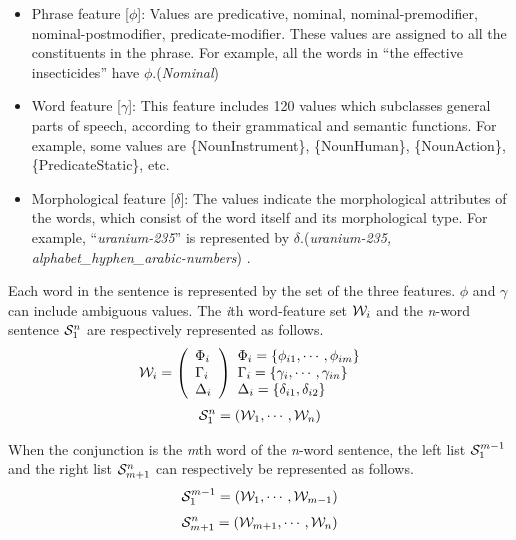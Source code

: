   \begin{itemize}
    \item Phrase feature [$\phi$]:
Values are predicative, nominal, nominal-premodifier,
nominal-postmodifier, predicate-modifier. These values are assigned to
all the constituents in the phrase.  For example, all the words in
``the effective insecticides'' have $\phi$.({\sl Nominal})

    \item Word feature [$\gamma$]:
This feature includes 120 values which subclasses
general parts of speech, according to their grammatical and
semantic functions. For example, some values are \{NounInstrument\},
\{NounHuman\}, \{NounAction\}, \{PredicateStatic\}, etc.

    \item Morphological feature [$\delta$]:
The values indicate the morphological attributes of the
words, which consist of the word itself and its morphological type.
For example, ``{\sl uranium-235}'' is represented by
$\delta$.({\sl uranium-235, alphabet\_hyphen\_arabic-numbers}) .
  \end{itemize}
Each word in the sentence is represented by the set of the three
features. $\phi$ and $\gamma$ can include ambiguous values.
The {\sl i}th word-feature set ${\cal W}_{i}$ and the {\sl
n}-word sentence
${\cal S}_{1}^{n}$ are respectively represented as follows.
  \begin{eqnarray*}
 {\cal W}_{i} = \left( \begin{array}{l}
\Phi_{i}\\
\Gamma_{i} \\ 
\Delta_{i} \end{array} \right) &  
\begin{array}{l}
\Phi_{i} = \{\phi_{i1},\cdots,\phi_{im}\} \\
\Gamma_{i} = \{\gamma_{i},\cdots,\gamma_{in}\}\\
\Delta_{i} = \{\delta_{i1},\delta_{i2}\}
\end{array}
  \end{eqnarray*}
\begin{eqnarray*}
 {\cal S}_{1}^{n} = ({\cal W}_{1},\cdots,{\cal W}_{n}) 
\end{eqnarray*}

When the conjunction is the {\sl m}th word of the {\sl n}-word
sentence, the left list ${\cal S}_{1}^{m-1}$ and the right
list ${\cal S}_{m+1}^{n}$ can respectively be represented as follows.
\begin{eqnarray*}
 {{\cal S}_{1}^{m-1}} =  ({\cal W}_{1},\cdots,{\cal W}_{m-1})
\end{eqnarray*}
\begin{eqnarray*}
 {{\cal S}_{m+1}^{n}} =  ({\cal W}_{m+1},\cdots,{\cal W}_{n}) 
\end{eqnarray*}

